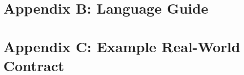 \documentclass[12pt,twoside]{report}
\begin{document}
\chapter*{Appendix B: Language Guide}
\label{chp:appendix-b}


\chapter*{Appendix C: Example Real-World Contract}
\label{chp:appendix-c}

\end{document}
